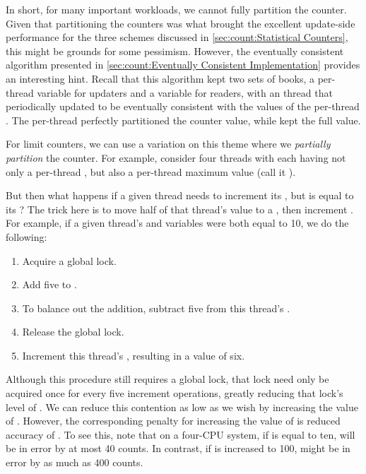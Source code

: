 In short, for many important workloads, we cannot fully partition the counter.
Given that partitioning the counters was what brought the excellent
update-side performance for the three schemes discussed in
\cref{sec:count:Statistical Counters}, this might be grounds
for some pessimism.
However, the eventually consistent algorithm presented in
\cref{sec:count:Eventually Consistent Implementation}
provides an interesting hint.
Recall that this algorithm kept two sets of books, a
per-thread  variable for updaters and a 
variable for readers, with an  thread that periodically
updated  to be eventually consistent with the values
of the per-thread .
The per-thread  perfectly partitioned the counter value, while
 kept the full value.

For limit counters, we can use a variation on this theme where we
\emph{partially partition} the counter.
For example, consider four threads with each having not only a
per-thread , but also a per-thread maximum value (call
it ).

But then what happens if a given thread needs to increment its
, but  is equal to its ?
The trick here is to move half of that thread's  value
to a , then increment .
For example, if a given thread's  and 
variables were both equal to 10, we do the following:

\begin{enumerate}
\item	Acquire a global lock.
\item	Add five to .
\item	To balance out the addition, subtract five from this
	thread's .
\item	Release the global lock.
\item	Increment this thread's , resulting in a value of six.
\end{enumerate}

Although this procedure still requires a global lock, that lock need only be
acquired once for every five increment operations, greatly reducing
that lock's level of .
We can reduce this contention as low as we wish by increasing the
value of .
However, the corresponding penalty for increasing the value of
 is reduced accuracy of .
To see this, note that on a four-CPU system, if 
is equal to ten,  will be in error by at most
40 counts.
In contrast, if  is increased to 100, 
might be in error by as much as 400 counts.


